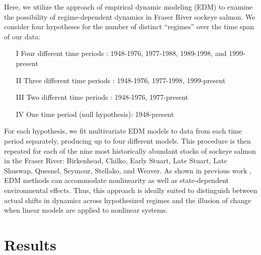 Here, we utilize the approach of empirical dynamic modeling (EDM) to examine the possibility of regime-dependent dynamics in Fraser River sockeye salmon. We consider four hypotheses for the number of distinct ``regimes'' over the time span of our data:
\begin{itemize}
\item[I] Four different time periods \cite{Beamish_2004a}: 1948-1976, 1977-1988, 1989-1998, and 1999-present
\item[II] Three different time periods \cite{Litzow_2014}: 1948-1976, 1977-1998, 1999-present
\item[III] Two different time periods \cite{McGowan_2003}: 1948-1976, 1977-present
\item[IV] One time period (null hypothesis): 1948-present
\end{itemize}

For each hypothesis, we fit multivariate EDM models \cite{Dixon_1999} to data from each time period separately, producing up to four different models. This procedure is then repeated for each of the nine most historically abundant stocks of sockeye salmon in the Fraser River: Birkenhead, Chilko, Early Stuart, Late Stuart, Late Shuswap, Quesnel, Seymour, Stellako, and Weaver. As shown in previous work \cite{Ye_2015}, EDM methods can accommodate nonlinearity as well as state-dependent environmental effects. Thus, this approach is ideally suited to distinguish between actual shifts in dynamics across hypothesized regimes and the illusion of change when linear models are applied to nonlinear systems.

\section{Results}

